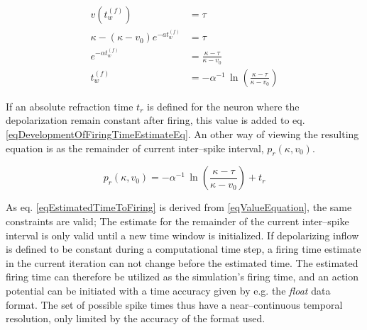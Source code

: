 	\begin{equation}
		\begin{split}
				v\left(t_w^{(f)}\right)			 							&= \tau \qquad 										\\	%
				\kappa - \left( \kappa - v_0 \right) e^{-at_w^{(f)}}  		&= \tau 											\\
				e^{-\alpha t_w^{(f)}} 			 						&= \frac{\kappa - \tau}{\kappa - v_0} 					\\
				t_w^{(f)}													&= -\alpha^{-1} \, \ln \left( \frac{\kappa - \tau}{\kappa - v_0} \right) 					
		\end{split}
		\label{eqDevelopmentOfFiringTimeEstimateEq}
	\end{equation}

	If an absolute refraction time $t_r$ is defined for the neuron where the depolarization remain constant after firing, this value is added to eq. \eqref{eqDevelopmentOfFiringTimeEstimateEq}.
	An other way of viewing the resulting equation is as the remainder of current inter--spike interval, $p_r(\kappa, v_0)$.

\begin{equation}
	p_r(\kappa, v_0)  	= -\alpha^{-1} \, \ln \left( \frac{\kappa - \tau}{\kappa - v_0} \right) + t_r
	\label{eqEstimatedTimeToFiring}
\end{equation}

	As eq. \eqref{eqEstimatedTimeToFiring} is derived from \eqref{eqValueEquation}, the same constraints are valid;
		The estimate for the remainder of the current inter--spike interval is only valid until a new time window is initialized.
	If depolarizing inflow is defined to be constant during a computational time step, a firing time estimate in the current iteration can not change before the estimated time. %
	The estimated firing time can therefore be utilized as the simulation's firing time, and an action potential can be initiated with a time accuracy given by e.g. the \emph{float} data format.
	The set of possible spike times thus have a near--continuous temporal resolution, only limited by the accuracy of the format used. %

